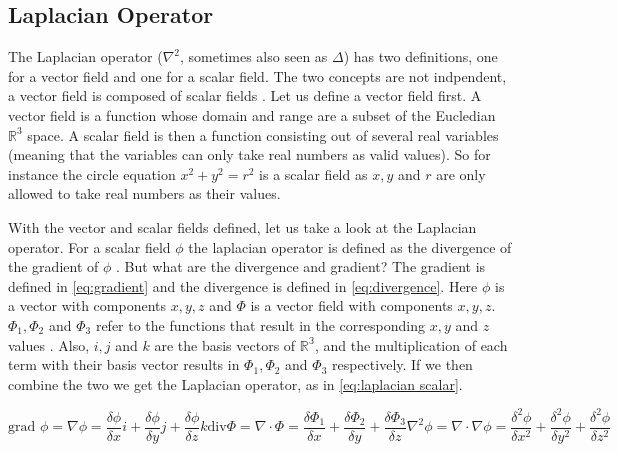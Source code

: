 \subsection{Laplacian Operator} \label{sec:laplace}
The Laplacian operator ($\nabla^2$, sometimes also seen as $\Delta$) has two definitions, one for a vector field and one for a scalar field. The two concepts are not indpendent, a vector field 
is composed of scalar fields \cite{vectorscalarfields}. Let us define a vector field first. A vector field is a function whose domain and range are a subset of the Eucledian $\mathbb{R}^3$ space. 
A scalar field is then a function consisting out of several real variables (meaning that the variables can only take real numbers as valid values). So for instance the circle equation 
$x^2 + y^2 = r^2$ is a scalar field as $x, y$ and $r$ are only allowed to take real numbers as their values. 

With the vector and scalar fields defined, let us take a look at the Laplacian operator. For a scalar field $\phi$ the laplacian operator is defined as the divergence of the gradient of $\phi$
\cite{laplacian}. But what are the divergence and gradient? The gradient is defined in \autoref{eq:gradient} and the divergence is defined in \autoref{eq:divergence}. Here $\phi$ is a vector 
with components $x, y, z$ and $\Phi$ is a vector field with components $x, y, z$. $\Phi_1, \Phi_2$ and $\Phi_3$ refer to the functions that result in the corresponding $x, y$ and $z$ values 
\cite{vectorscalarfields}. Also, $i, j$ and $k$ are the basis vectors of $\mathbb{R^3}$, and the multiplication of each term with their basis vector results in $\Phi_1, \Phi_2$ and $\Phi_3$
respectively. If we then combine the two we get the Laplacian operator, as in \autoref{eq:laplacian scalar}.

\begin{subequations}
    \begin{equation}
        \text{grad } \phi = \nabla \phi = \frac{\delta \phi}{\delta x}i + \frac{\delta \phi}{\delta y}j + \frac{\delta \phi}{\delta z}k
        \label{eq:gradient}
    \end{equation}
    \begin{equation}
        \text{div} \Phi = \nabla \cdot \Phi = \frac{\delta \Phi_1}{\delta x} + \frac{\delta \Phi_2}{\delta y} + \frac{\delta \Phi_3}{\delta z}
        \label{eq:divergence}
    \end{equation}
    \begin{equation}
        \nabla^2 \phi = \nabla \cdot \nabla \phi = \frac{\delta^2 \phi}{\delta x^2} + \frac{\delta^2 \phi}{\delta y^2} + \frac{\delta^2 \phi}{\delta z^2}
        \label{eq:laplacian scalar}
    \end{equation}
\end{subequations}

